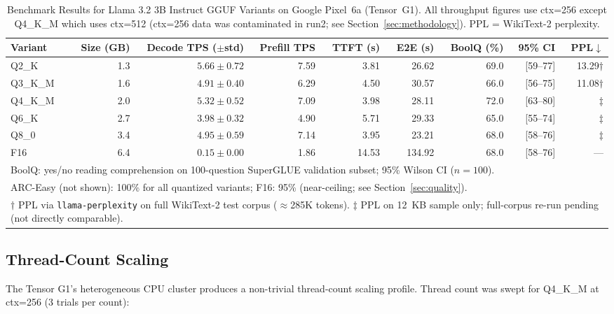 \documentclass[conference]{IEEEtran}
\begin{document}
\begin{table}[t]
\centering
\caption{Benchmark Results for Llama 3.2 3B Instruct GGUF Variants on Google Pixel~6a (Tensor~G1).
All throughput figures use ctx=256 except Q4\_K\_M which uses ctx=512 (ctx=256 data was
contaminated in run2; see Section~\ref{sec:methodology}). PPL = WikiText-2 perplexity.}
\label{tab:main_results}
\setlength{\tabcolsep}{5pt}
\begin{tabular}{lrrrrrrrr}
\toprule
\textbf{Variant} & \textbf{Size (GB)} & \textbf{Decode TPS ($\pm$std)} &
\textbf{Prefill TPS} & \textbf{TTFT (s)} & \textbf{E2E (s)} & \textbf{BoolQ (\%)} & \textbf{95\% CI} & \textbf{PPL$\downarrow$} \\
\midrule
Q2\_K    & 1.3 & $5.66 \pm 0.72$ & 7.59  & 3.81  & 26.62  & 69.0 & [59--77] & 13.29$\dagger$ \\
Q3\_K\_M & 1.6 & $4.91 \pm 0.40$ & 6.29  & 4.50  & 30.57  & 66.0 & [56--75] & 11.08$\dagger$ \\
Q4\_K\_M & 2.0 & $5.32 \pm 0.52$ & 7.09  & 3.98  & 28.11  & 72.0 & [63--80] & $\ddagger$ \\
Q6\_K    & 2.7 & $3.98 \pm 0.32$ & 4.90  & 5.71  & 29.33  & 65.0 & [55--74] & $\ddagger$ \\
Q8\_0    & 3.4 & $4.95 \pm 0.59$ & 7.14  & 3.95  & 23.21  & 68.0 & [58--76] & $\ddagger$ \\
F16      & 6.4 & $0.15 \pm 0.00$ & 1.86  & 14.53 & 134.92 & 68.0 & [58--76] & --- \\
\midrule
\multicolumn{9}{l}{\footnotesize BoolQ: yes/no reading comprehension on 100-question SuperGLUE validation subset; 95\% Wilson CI ($n{=}100$).}\\
\multicolumn{9}{l}{\footnotesize ARC-Easy (not shown): 100\% for all quantized variants; F16: 95\% (near-ceiling; see Section~\ref{sec:quality}).}\\
\multicolumn{9}{l}{\footnotesize $\dagger$ PPL via \texttt{llama-perplexity} on full WikiText-2 test corpus (${\approx}$285K tokens).
$\ddagger$ PPL on 12~KB sample only; full-corpus re-run pending (not directly comparable).}\\
\bottomrule
\end{tabular}
\end{table}

\subsection{Thread-Count Scaling}

The Tensor G1's heterogeneous CPU cluster produces a non-trivial thread-count
scaling profile. Thread count was swept for Q4\_K\_M at ctx=256 (3 trials per
count):
\end{document}
